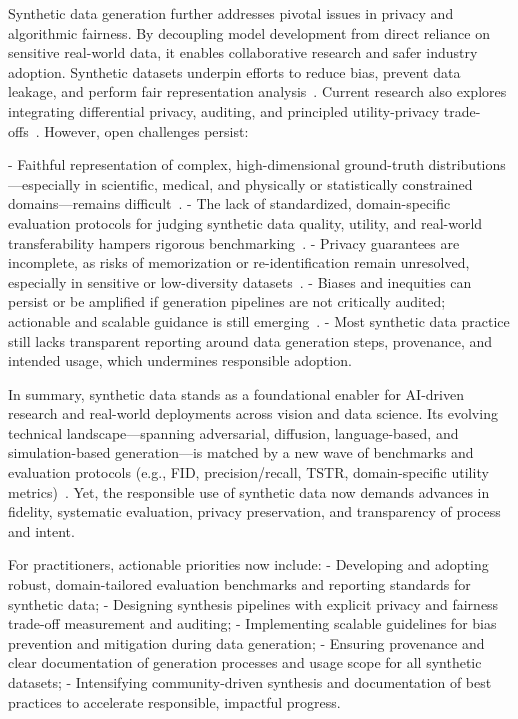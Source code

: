 \documentclass[sigconf]{acmart}
\begin{document}
Synthetic data generation further addresses pivotal issues in privacy and algorithmic fairness. By decoupling model development from direct reliance on sensitive real-world data, it enables collaborative research and safer industry adoption. Synthetic datasets underpin efforts to reduce bias, prevent data leakage, and perform fair representation analysis~\cite{ref43,ref51,ref52,ref62,ref87,ref88}. Current research also explores integrating differential privacy, auditing, and principled utility-privacy trade-offs~\cite{ref13,ref21,ref87,ref88,ref89}. However, open challenges persist:

- Faithful representation of complex, high-dimensional ground-truth distributions---especially in scientific, medical, and physically or statistically constrained domains---remains difficult~\cite{ref10,ref15,ref17,ref74,ref89}.
- The lack of standardized, domain-specific evaluation protocols for judging synthetic data quality, utility, and real-world transferability hampers rigorous benchmarking~\cite{ref13,ref24,ref62,ref87,ref88,ref89}.
- Privacy guarantees are incomplete, as risks of memorization or re-identification remain unresolved, especially in sensitive or low-diversity datasets~\cite{ref13,ref21,ref87,ref88,ref89}.
- Biases and inequities can persist or be amplified if generation pipelines are not critically audited; actionable and scalable guidance is still emerging~\cite{ref87,ref88,ref89}.
- Most synthetic data practice still lacks transparent reporting around data generation steps, provenance, and intended usage, which undermines responsible adoption.

In summary, synthetic data stands as a foundational enabler for AI-driven research and real-world deployments across vision and data science. Its evolving technical landscape---spanning adversarial, diffusion, language-based, and simulation-based generation---is matched by a new wave of benchmarks and evaluation protocols (e.g., FID, precision/recall, TSTR, domain-specific utility metrics)~\cite{ref10,ref12,ref18,ref24,ref25,ref26,ref64,ref89}. Yet, the responsible use of synthetic data now demands advances in fidelity, systematic evaluation, privacy preservation, and transparency of process and intent.

For practitioners, actionable priorities now include:
- Developing and adopting robust, domain-tailored evaluation benchmarks and reporting standards for synthetic data;
- Designing synthesis pipelines with explicit privacy and fairness trade-off measurement and auditing;
- Implementing scalable guidelines for bias prevention and mitigation during data generation;
- Ensuring provenance and clear documentation of generation processes and usage scope for all synthetic datasets;
- Intensifying community-driven synthesis and documentation of best practices to accelerate responsible, impactful progress.
\end{document}
